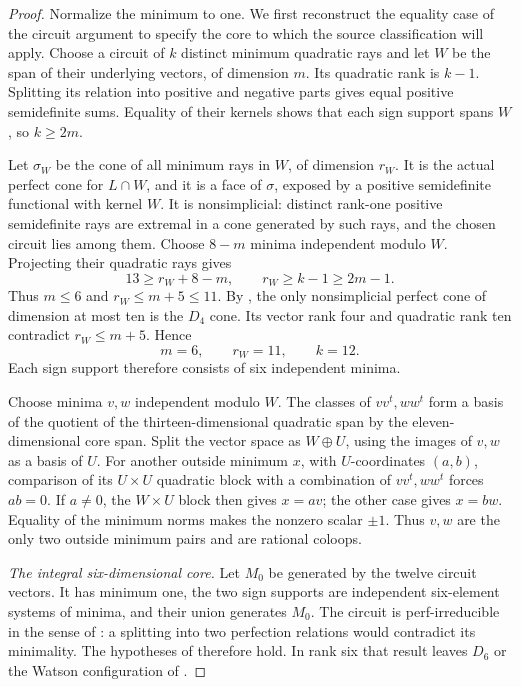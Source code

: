 \documentclass[11pt,a4paper]{article}
\theoremstyle{definition}
\begin{document}
\begin{proof}
Normalize the minimum to one. We first reconstruct the equality case
of the circuit argument to specify the core to which the source
classification will apply. Choose a circuit of $k$ distinct minimum
quadratic rays and let $W$ be the span of their underlying vectors,
of dimension $m$. Its quadratic rank is $k-1$. Splitting its relation
into positive and negative parts gives equal positive semidefinite
sums. Equality of their kernels shows that each sign support spans
$W$, so $k\geq2m$.

Let $\sigma_W$ be the cone of all minimum rays in $W$, of dimension
$r_W$. It is the actual perfect cone for $L\cap W$, and it is a face
of $\sigma$, exposed by a positive semidefinite functional with
kernel $W$. It is nonsimplicial: distinct rank-one positive
semidefinite rays are extremal in a cone generated by such rays,
and the chosen circuit lies among them. Choose $8-m$ minima
independent modulo $W$. Projecting their quadratic rays gives
\[
 13\geq r_W+8-m,
 \qquad r_W\geq k-1\geq2m-1.
\]
Thus $m\leq6$ and $r_W\leq m+5\leq11$.
By \cite[Theorem~1.1(ii)]{DutourHulekSchurmann2015}, the only
nonsimplicial perfect cone of dimension at most ten is the $D_4$
cone. Its vector rank four and quadratic rank ten contradict
$r_W\leq m+5$. Hence
\[
             m=6,\qquad r_W=11,\qquad k=12.             \tag{R8.1}
\]
Each sign support therefore consists of six independent minima.

Choose minima $v,w$ independent modulo $W$. The classes of
$vv^t,ww^t$ form a basis of the quotient of the thirteen-dimensional
quadratic span by the eleven-dimensional core span. Split the vector
space as $W\oplus U$, using the images of $v,w$ as a basis of $U$.
For another outside minimum $x$, with $U$-coordinates $(a,b)$,
comparison of its $U\times U$ quadratic block with a combination
of $vv^t,ww^t$ forces $ab=0$. If $a\ne0$, the $W\times U$ block
then gives $x=av$; the other case gives $x=bw$. Equality of the
minimum norms makes the nonzero scalar $\pm1$. Thus $v,w$ are the
only two outside minimum pairs and are rational coloops.

\medskip\noindent
\emph{The integral six-dimensional core.}
Let $M_0$ be generated by the twelve circuit vectors. It has minimum
one, the two sign supports are independent six-element systems of
minima, and their union generates $M_0$. The circuit is
perf-irreducible in the sense of
\cite[Definition~2.4 and \S3]{BergeMartinet2009}: a splitting into
two perfection relations would contradict its minimality.
The hypotheses of \cite[Corollary~6.9]{BergeMartinet2009} therefore
hold. In rank six that result leaves $D_6$ or the Watson
configuration of \cite[Theorem~5.1]{BergeMartinet2009}.


\end{proof}
\end{document}
